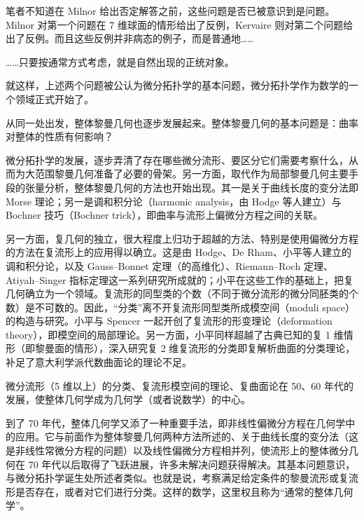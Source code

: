 笔者不知道在 Milnor 给出否定解答之前，这些问题是否已被意识到是问题。Milnor 对第一个问题在 7 维球面的情形给出了反例，Kervaire 则对第二个问题给出了反例。而且这些反例并非病态的例子，而是普通地……

……只要按通常方式考虑，就是自然出现的正统对象。

就这样，上述两个问题被公认为微分拓扑学的基本问题，微分拓扑学作为数学的一个领域正式开始了。

从同一处出发，整体黎曼几何也逐步发展起来。整体黎曼几何的基本问题是：曲率对整体的性质有何影响？

微分拓扑学的发展，逐步弄清了存在哪些微分流形、要区分它们需要考察什么，从而为大范围黎曼几何准备了必要的骨架。另一方面，取代作为局部黎曼几何主要手段的张量分析，整体黎曼几何的方法也开始出现。其一是关于曲线长度的变分法即 Morse 理论；另一是调和积分论（harmonic analysis，由 Hodge 等人建立）与 Bochner 技巧（Bochner trick），即曲率与流形上偏微分方程之间的关联。



另一方面，复几何的独立，很大程度上归功于超越的方法、特别是使用偏微分方程的方法在复流形上的应用得以确立。这是由 Hodge、De Rham、小平等人建立的调和积分论，以及 Gauss–Bonnet 定理（的高维化）、Riemann–Roch 定理、Atiyah–Singer 指标定理这一系列研究所成就的；小平在这些工作的基础上，把复几何确立为一个领域。复流形的同型类的个数（不同于微分流形的微分同胚类的个数）是不可数的。因此，“分类”离不开复流形同型类所成模空间（moduli space）的构造与研究。小平与 Spencer 一起开创了复流形的形变理论（deformation theory），即模空间的局部理论。另一方面，小平同样超越了古典已知的复 1 维情形（即黎曼面的情形），深入研究复 2 维复流形的分类即复解析曲面的分类理论，补足了意大利学派代数曲面论的理论不足。

微分流形（5 维以上）的分类、复流形模空间的理论、复曲面论在 50、60 年代的发展，使整体几何学成为几何学（或者说数学）的中心。

到了 70 年代，整体几何学又添了一种重要手法，即非线性偏微分方程在几何学中的应用。它与前面作为整体黎曼几何两种方法所述的、关于曲线长度的变分法（这是非线性常微分方程的问题）以及线性偏微分方程相并列，使流形上的整体微分几何在 70 年代以后取得了飞跃进展，许多未解决问题获得解决。其基本问题意识，与微分拓扑学诞生处所述者类似。也就是说，考察满足给定条件的黎曼流形或复流形是否存在，或者对它们进行分类。这样的数学，这里权且称为“通常的整体几何学”。

